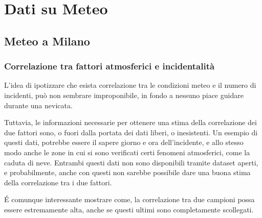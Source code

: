 \documentclass[a4paper,12pt]{report}
\begin{document}
\chapter{Dati su Meteo}

\section{Meteo a Milano}

\subsection{Correlazione tra fattori atmosferici e incidentalità}

L'idea di ipotizzare che esista correlazione tra le condizioni meteo e il numero 
di incidenti, può non sembrare improponibile, in fondo a nessuno piace guidare 
durante una nevicata.

Tuttavia, le informazioni necessarie per ottenere una stima della correlazione 
dei due fattori sono, o fuori dalla portata dei dati liberi, o inesistenti. 
Un esempio di questi dati, potrebbe essere il sapere giorno e ora 
dell'incidente, e allo stesso modo anche le zone in cui si sono verificati certi 
fenomeni atmosferici, come la caduta di neve. 
Entrambi questi dati non sono disponibili tramite dataset aperti, e probabilmente, 
anche con questi non sarebbe possibile dare una buona stima della correlazione 
tra i due fattori.

\'E comunque interessante mostrare come, la correlazione tra due campioni possa essere 
estremamente alta, anche se questi ultimi sono completamente scollegati.
\end{document}
